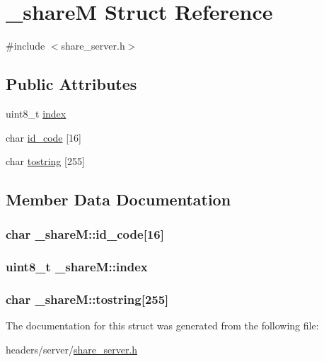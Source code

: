 \hypertarget{struct__share_m}{\section{\-\_\-share\-M Struct Reference}
\label{struct__share_m}
}


{\ttfamily \#include $<$share\-\_\-server.\-h$>$}

\subsection*{Public Attributes}
\begin{DoxyCompactItemize}
\item 
uint8\-\_\-t \hyperlink{struct__share_m_a30792c4b007e8273d3832fe2d5e70987}{index}
\item 
char \hyperlink{struct__share_m_aba5b7eea37d1a2b8eade0ea20ad1b4d8}{id\-\_\-code} \mbox{[}16\mbox{]}
\item 
char \hyperlink{struct__share_m_a3f1adf9dcef316bf853e709401b041fd}{tostring} \mbox{[}255\mbox{]}
\end{DoxyCompactItemize}


\subsection{Member Data Documentation}
\hypertarget{struct__share_m_aba5b7eea37d1a2b8eade0ea20ad1b4d8}{
\subsubsection[{id\-\_\-code}]{\setlength{\rightskip}{0pt plus 5cm}char \-\_\-share\-M\-::id\-\_\-code\mbox{[}16\mbox{]}}}\label{struct__share_m_aba5b7eea37d1a2b8eade0ea20ad1b4d8}
\hypertarget{struct__share_m_a30792c4b007e8273d3832fe2d5e70987}{
\subsubsection[{index}]{\setlength{\rightskip}{0pt plus 5cm}uint8\-\_\-t \-\_\-share\-M\-::index}}\label{struct__share_m_a30792c4b007e8273d3832fe2d5e70987}
\hypertarget{struct__share_m_a3f1adf9dcef316bf853e709401b041fd}{
\subsubsection[{tostring}]{\setlength{\rightskip}{0pt plus 5cm}char \-\_\-share\-M\-::tostring\mbox{[}255\mbox{]}}}\label{struct__share_m_a3f1adf9dcef316bf853e709401b041fd}


The documentation for this struct was generated from the following file\-:\begin{DoxyCompactItemize}
\item 
headers/server/\hyperlink{share__server_8h}{share\-\_\-server.\-h}\end{DoxyCompactItemize}
